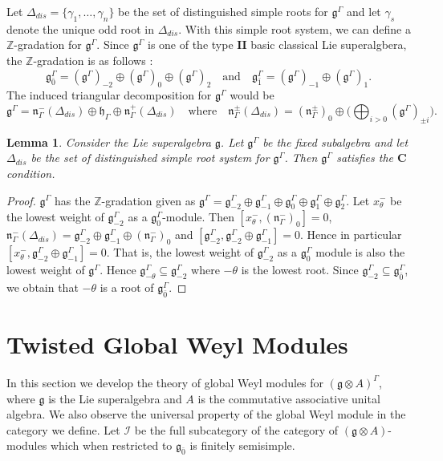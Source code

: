 \documentclass[11pt]{amsart}
\theoremstyle{plain}
\newtheorem{lemma}[thm]{Lemma}
\theoremstyle{definition}
\newcommand{\g}{\mathfrak{g}}
\newcommand{\h}{\mathfrak{h}}
\newcommand{\n}{\mathfrak{n}}
\begin{document}
 Let $\Delta_{dis}=\{\gamma_1,\ldots,\gamma_n\}$ be the set of distinguished simple roots for $\g^{\Gamma}$ and let $\gamma_s$ denote the unique odd root in $\Delta_{dis}$. With this simple root system, we can define a $\mathbb{Z}$-gradation for $\g^{\Gamma}$. Since $\g^{\Gamma}$ is one of the type $\textbf{II}$ basic classical Lie superalgbera, the $\mathbb{Z}$-gradation is as follows \cite{BCM19}:
 \begin{equation*}
     \g_{\bar{0}}^{\Gamma}=(\g^{\Gamma})_{-2}\oplus(\g^{\Gamma})_{0}\oplus(\g^{\Gamma})_{2}\quad\mbox{and}\quad\g_{\bar{1}}^{\Gamma}=(\g^{\Gamma})_{-1}\oplus(\g^{\Gamma})_{1}.
 \end{equation*} 
 The induced triangular decomposition for $\g^{\Gamma}$ would be
 \begin{equation*}
     \g^{\Gamma}=\n_{\Gamma}^{-}(\Delta_{dis})\oplus\h_{\Gamma}\oplus\n_{\Gamma}^{+}(\Delta_{dis}) \quad \mbox{where} \quad \n_{\Gamma}^{\pm}(\Delta_{dis})=(\n_{\Gamma}^{\pm})_{0}\oplus\biggl(\bigoplus_{i>0}(\g^{\Gamma})_{\pm i}\biggl).
 \end{equation*}
 \begin{lemma}
     Consider the Lie superalgebra $\g$. Let $\g^{\Gamma}$ be the fixed subalgebra and let $\Delta_{dis}$ be the set of distinguished simple root system for $\g^{\Gamma}$. Then $\g^{\Gamma}$ satisfies the $\mathbf{C}$ condition.
 \end{lemma}
 \begin{proof}
     $\g^{\Gamma}$ has the $\mathbb{Z}$-gradation given as $\g^{\Gamma}=\g^{\Gamma}_{-2}\oplus\g^{\Gamma}_{-1}\oplus\g^{\Gamma}_{0}\oplus\g^{\Gamma}_{1}\oplus\g^{\Gamma}_{2}$. Let $x^{-}_{\theta}$ be the lowest weight of $\g^{\Gamma}_{-2}$ as a $\g_{0}^{\Gamma}$-module. Then $[x^{-}_{\theta},(\n^{-}_{\Gamma})_{0}]=0$, $\n^-_{\Gamma}(\Delta_{dis})=\g^{\Gamma}_{-2}\oplus\g^{\Gamma}_{-1}\oplus(\n^-_{\Gamma})_{0}$ and $[\g^{\Gamma}_{-2},\g^{\Gamma}_{-2}\oplus\g^{\Gamma}_{-1}]=0$. Hence in particular $[x^{-}_{\theta},\g^{\Gamma}_{-2}\oplus\g^{\Gamma}_{-1}]=0$. That is, the lowest weight of $\g^{\Gamma}_{-2}$ as a $\g^{\Gamma}_{0}$ module is also the lowest weight of $\g^{\Gamma}$. Hence $\g^{\Gamma}_{-\theta}\subseteq\g^{\Gamma}_{-2}$ where $-\theta$ is the lowest root. Since $\g_{-2}^{\Gamma}\subseteq\g^{\Gamma}_{\bar{0}}$, we obtain that $-\theta$ is a root of $\g_{\bar{0}}^{\Gamma}$.
 \end{proof}
  \section{Twisted Global Weyl Modules}\label{sec:5}
  In this section we develop the theory of global Weyl modules for $(\g\otimes A)^{\Gamma}$, where $\g$ is the Lie superalgebra and $A$ is the commutative associative unital algebra. We also observe the universal property of the global Weyl module in the category we define. Let $\mathcal{I}$ be the full subcategory of the category of $(\g\otimes A)$-modules which when restricted to $\g_{\bar{0}}$ is finitely semisimple.
\end{document}
